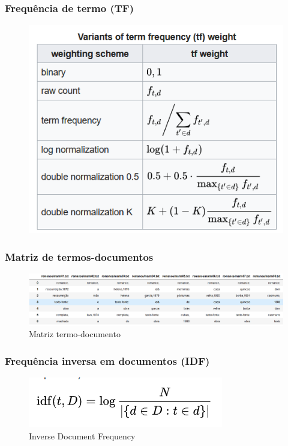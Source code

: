 \documentclass{beamer}
\begin{document}



\begin{frame}
\frametitle{Frequência de termo (TF)}
\begin{figure}
	\centering
	\includegraphics[width=0.7\linewidth]{TF}
	\label{fig:tf}
\end{figure}
\end{frame}



\begin{frame}
\frametitle{Matriz de termos-documentos}
\begin{figure}
	\centering
	\includegraphics[width=0.7\linewidth]{matriz}
	\caption{Matriz termo-documento}
	\label{fig:matriz}
\end{figure}

\end{frame}


\begin{frame}
\frametitle{Frequência inversa em documentos (IDF)}
\begin{figure}
	\centering
	\includegraphics[width=0.7\linewidth]{idf}
	\caption{Inverse Document Frequency}
	\label{fig:idf}
\end{figure}
	
\end{frame}
\end{document}
